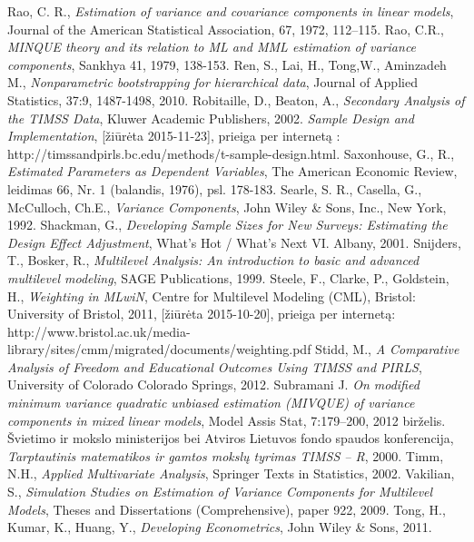 \documentclass[12pt,a4paper]{article}
\begin{document}
\begin{thebibliography}{1}
 Rao, C. R., \textit{Estimation of variance and covariance components in linear models}, Journal of the American Statistical Association, 67, 1972, 112–115.
 Rao, C.R., \textit{MINQUE theory and its relation to ML and MML estimation of variance components}, Sankhya 41, 1979, 138-153.
 Ren, S., Lai, H., Tong,W., Aminzadeh M., \textit{Nonparametric bootstrapping for hierarchical data}, Journal of Applied Statistics, 37:9, 1487-1498, 2010.
 Robitaille, D., Beaton, A., \textit{Secondary Analysis of the TIMSS Data}, Kluwer Academic Publishers, 2002.
 \textit{Sample Design and Implementation}, [žiūrėta 2015-11-23], prieiga per internetą : http://timssandpirls.bc.edu/methods/t-sample-design.html.
 Saxonhouse, G., R., \textit{Estimated Parameters as Dependent Variables}, The American Economic Review,
leidimas 66, Nr. 1 (balandis, 1976), psl. 178-183.
 Searle, S. R., Casella, G., McCulloch, Ch.E., \textit{Variance Components}, John Wiley \& Sons, Inc., New York, 1992.
 Shackman, G., \textit{Developing Sample Sizes for New Surveys: Estimating the Design Effect Adjustment}, What’s Hot / What’s Next VI. Albany, 2001.
 Snijders, T., Bosker, R., \textit{Multilevel Analysis: An introduction to basic and advanced multilevel modeling}, SAGE Publications, 1999.
 Steele, F., Clarke, P., Goldstein, H., \textit{Weighting in MLwiN}, Centre for Multilevel Modeling (CML), Bristol: University of Bristol, 2011, [žiūrėta 2015-10-20], prieiga per internetą: http://www.bristol.ac.uk/media-library/sites/cmm/migrated/documents/weighting.pdf
 Stidd, M., \textit{A Comparative Analysis of Freedom and Educational Outcomes Using TIMSS and PIRLS}, University of Colorado Colorado Springs, 2012.
Subramani J. \textit{On modified minimum variance quadratic unbiased estimation (MIVQUE) of variance components in mixed linear models}, Model Assis Stat, 7:179–200, 2012 birželis.
 Švietimo ir mokslo ministerijos bei Atviros Lietuvos fondo spaudos konferencija, \textit{Tarptautinis matematikos ir gamtos mokslų tyrimas TIMSS – R}, 2000.
Timm, N.H., \textit{Applied Multivariate Analysis}, Springer Texts in Statistics, 2002.
 Vakilian, S., \textit{Simulation Studies on Estimation of Variance Components for Multilevel Models}, Theses and Dissertations (Comprehensive), paper 922, 2009.
 Tong, H., Kumar, K., Huang, Y., \textit{Developing Econometrics}, John Wiley \& Sons, 2011.

\end{thebibliography}
\end{document}
